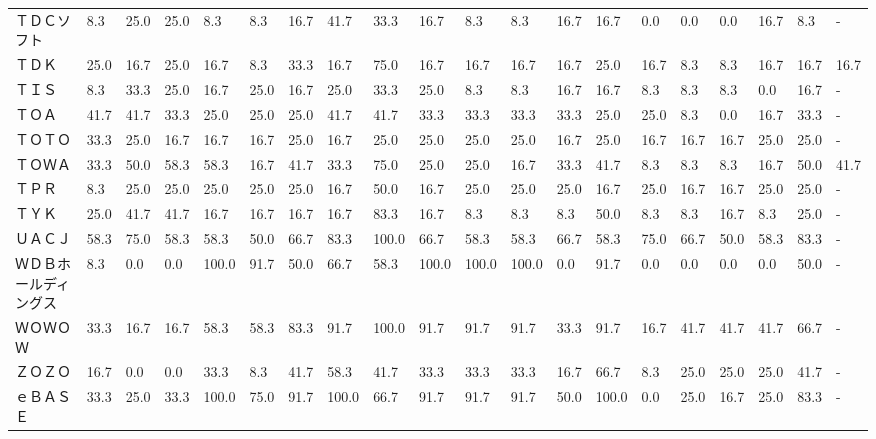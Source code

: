 \documentclass[a4paper，11pt]{jsarticle}
\begin{document}
\begin{longtable}[c]{lp{3mm}p{3mm}p{3mm}p{3mm}p{3mm}p{3mm}p{3mm}p{3mm}p{3mm}p{3mm}p{3mm}p{3mm}p{3mm}p{3mm}p{3mm}p{3mm}p{3mm}p{3mm}p{3mm}}
ＴＤＣソフト          &    8.3 &   25.0 &      25.0 &       8.3 &        8.3 &   16.7 &   41.7 &   33.3 &    16.7 &     8.3 &    8.3 &  16.7 &   16.7 &     0.0 &     0.0 &   0.0 &  16.7 &   8.3 &     - \\
ＴＤＫ             &   25.0 &   16.7 &      25.0 &      16.7 &        8.3 &   33.3 &   16.7 &   75.0 &    16.7 &    16.7 &   16.7 &  16.7 &   25.0 &    16.7 &     8.3 &   8.3 &  16.7 &  16.7 &  16.7 \\
ＴＩＳ             &    8.3 &   33.3 &      25.0 &      16.7 &       25.0 &   16.7 &   25.0 &   33.3 &    25.0 &     8.3 &    8.3 &  16.7 &   16.7 &     8.3 &     8.3 &   8.3 &   0.0 &  16.7 &     - \\
ＴＯＡ             &   41.7 &   41.7 &      33.3 &      25.0 &       25.0 &   25.0 &   41.7 &   41.7 &    33.3 &    33.3 &   33.3 &  33.3 &   25.0 &    25.0 &     8.3 &   0.0 &  16.7 &  33.3 &     - \\
ＴＯＴＯ            &   33.3 &   25.0 &      16.7 &      16.7 &       16.7 &   25.0 &   16.7 &   25.0 &    25.0 &    25.0 &   25.0 &  16.7 &   25.0 &    16.7 &    16.7 &  16.7 &  25.0 &  25.0 &     - \\
ＴＯＷＡ            &   33.3 &   50.0 &      58.3 &      58.3 &       16.7 &   41.7 &   33.3 &   75.0 &    25.0 &    25.0 &   16.7 &  33.3 &   41.7 &     8.3 &     8.3 &   8.3 &  16.7 &  50.0 &  41.7 \\
ＴＰＲ             &    8.3 &   25.0 &      25.0 &      25.0 &       25.0 &   25.0 &   16.7 &   50.0 &    16.7 &    25.0 &   25.0 &  25.0 &   16.7 &    25.0 &    16.7 &  16.7 &  25.0 &  25.0 &     - \\
ＴＹＫ             &   25.0 &   41.7 &      41.7 &      16.7 &       16.7 &   16.7 &   16.7 &   83.3 &    16.7 &     8.3 &    8.3 &   8.3 &   50.0 &     8.3 &     8.3 &  16.7 &   8.3 &  25.0 &     - \\
ＵＡＣＪ            &   58.3 &   75.0 &      58.3 &      58.3 &       50.0 &   66.7 &   83.3 &  100.0 &    66.7 &    58.3 &   58.3 &  66.7 &   58.3 &    75.0 &    66.7 &  50.0 &  58.3 &  83.3 &     - \\
ＷＤＢホールディングス     &    8.3 &    0.0 &       0.0 &     100.0 &       91.7 &   50.0 &   66.7 &   58.3 &   100.0 &   100.0 &  100.0 &   0.0 &   91.7 &     0.0 &     0.0 &   0.0 &   0.0 &  50.0 &     - \\
ＷＯＷＯＷ           &   33.3 &   16.7 &      16.7 &      58.3 &       58.3 &   83.3 &   91.7 &  100.0 &    91.7 &    91.7 &   91.7 &  33.3 &   91.7 &    16.7 &    41.7 &  41.7 &  41.7 &  66.7 &     - \\
ＺＯＺＯ            &   16.7 &    0.0 &       0.0 &      33.3 &        8.3 &   41.7 &   58.3 &   41.7 &    33.3 &    33.3 &   33.3 &  16.7 &   66.7 &     8.3 &    25.0 &  25.0 &  25.0 &  41.7 &     - \\
ｅＢＡＳＥ           &   33.3 &   25.0 &      33.3 &     100.0 &       75.0 &   91.7 &  100.0 &   66.7 &    91.7 &    91.7 &   91.7 &  50.0 &  100.0 &     0.0 &    25.0 &  16.7 &  25.0 &  83.3 &     - \\
\end{longtable}
\end{document}
